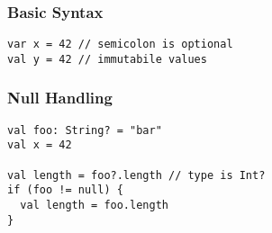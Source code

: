 

\begin{frame}[fragile] \frametitle{Basic Syntax}
\begin{lstlisting}
var x = 42 // semicolon is optional
val y = 42 // immutabile values
\end{lstlisting}
\end{frame}


\begin{frame}[fragile]
	\frametitle{Null Handling}
\begin{lstlisting}
val foo: String? = "bar"
val x = 42

val length = foo?.length // type is Int?
if (foo != null) {
  val length = foo.length
}
\end{lstlisting}
\end{frame}


